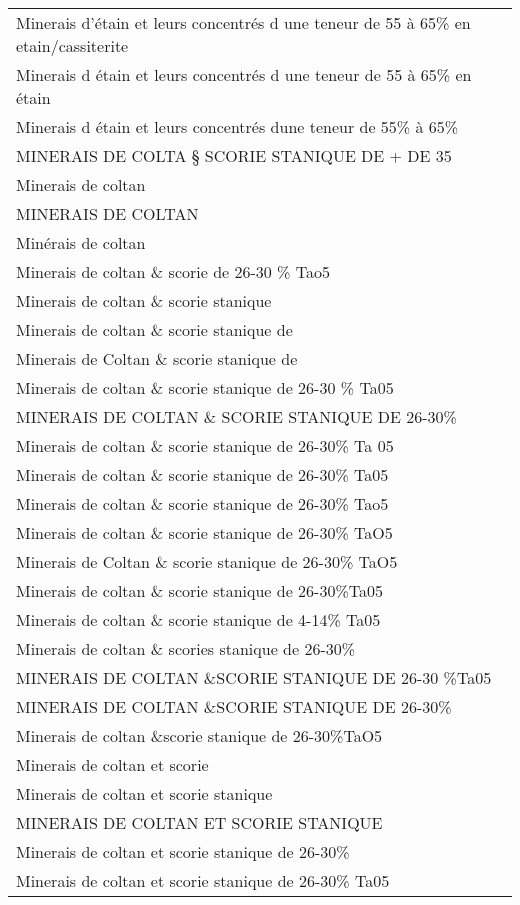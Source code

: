 \documentclass[
]{book}
\begin{document}
\begin{longtable}[t]{l}
\addlinespace
Minerais d'étain et leurs concentrés d une teneur de 55 à 65\% en etain/cassiterite\\
Minerais d étain et leurs concentrés d une teneur de 55 à 65\% en étain\\
Minerais d étain et leurs concentrés dune teneur de 55\% à 65\%\\
MINERAIS DE COLTA § SCORIE STANIQUE DE + DE 35\\
Minerais de coltan\\
\addlinespace
MINERAIS DE COLTAN\\
Minérais de coltan\\
Minerais de coltan \& scorie de 26-30 \% Tao5\\
Minerais de coltan \& scorie stanique\\
Minerais de coltan \& scorie stanique de\\
\addlinespace
Minerais de Coltan \& scorie stanique de\\
Minerais de coltan \& scorie stanique de 26-30 \% Ta05\\
MINERAIS DE COLTAN \& SCORIE STANIQUE DE 26-30\%\\
Minerais de coltan \& scorie stanique de 26-30\% Ta 05\\
Minerais de coltan \& scorie stanique de 26-30\% Ta05\\
\addlinespace
Minerais de coltan \& scorie stanique de 26-30\% Tao5\\
Minerais de coltan \& scorie stanique de 26-30\% TaO5\\
Minerais de Coltan \& scorie stanique de 26-30\% TaO5\\
Minerais de coltan \& scorie stanique de 26-30\%Ta05\\
Minerais de coltan \& scorie stanique de 4-14\% Ta05\\
\addlinespace
Minerais de coltan \& scories stanique de 26-30\%\\
MINERAIS DE COLTAN \&SCORIE STANIQUE DE 26-30 \%Ta05\\
MINERAIS DE COLTAN \&SCORIE STANIQUE DE 26-30\%\\
Minerais de coltan \&scorie stanique de 26-30\%TaO5\\
Minerais de coltan et scorie\\
\addlinespace
Minerais de coltan et scorie stanique\\
MINERAIS DE COLTAN ET SCORIE STANIQUE\\
Minerais de coltan et scorie stanique de 26-30\%\\
Minerais de coltan et scorie stanique de 26-30\% Ta05\\

\end{longtable}
\end{document}
